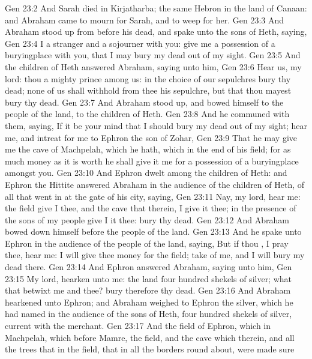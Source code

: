 \vs Gen 23:2 And Sarah died in Kirjatharba; the same  Hebron in the land of Canaan: and Abraham came to mourn for Sarah, and to weep for her.
\vs Gen 23:3 And Abraham stood up from before his dead, and spake unto the sons of Heth, saying,
\vs Gen 23:4 I  a stranger and a sojourner with you: give me a possession of a buryingplace with you, that I may bury my dead out of my sight.
\vs Gen 23:5 And the children of Heth answered Abraham, saying unto him,
\vs Gen 23:6 Hear us, my lord: thou  a mighty prince among us: in the choice of our sepulchres bury thy dead; none of us shall withhold from thee his sepulchre, but that thou mayest bury thy dead.
\vs Gen 23:7 And Abraham stood up, and bowed himself to the people of the land,  to the children of Heth.
\vs Gen 23:8 And he communed with them, saying, If it be your mind that I should bury my dead out of my sight; hear me, and intreat for me to Ephron the son of Zohar,
\vs Gen 23:9 That he may give me the cave of Machpelah, which he hath, which  in the end of his field; for as much money as it is worth he shall give it me for a possession of a buryingplace amongst you.
\vs Gen 23:10 And Ephron dwelt among the children of Heth: and Ephron the Hittite answered Abraham in the audience of the children of Heth,  of all that went in at the gate of his city, saying,
\vs Gen 23:11 Nay, my lord, hear me: the field give I thee, and the cave that  therein, I give it thee; in the presence of the sons of my people give I it thee: bury thy dead.
\vs Gen 23:12 And Abraham bowed down himself before the people of the land.
\vs Gen 23:13 And he spake unto Ephron in the audience of the people of the land, saying, But if thou , I pray thee, hear me: I will give thee money for the field; take  of me, and I will bury my dead there.
\vs Gen 23:14 And Ephron answered Abraham, saying unto him,
\vs Gen 23:15 My lord, hearken unto me: the land  four hundred shekels of silver; what  that betwixt me and thee? bury therefore thy dead.
\vs Gen 23:16 And Abraham hearkened unto Ephron; and Abraham weighed to Ephron the silver, which he had named in the audience of the sons of Heth, four hundred shekels of silver, current  with the merchant.
\vs Gen 23:17 And the field of Ephron, which  in Machpelah, which  before Mamre, the field, and the cave which  therein, and all the trees that  in the field, that  in all the borders round about, were made sure
